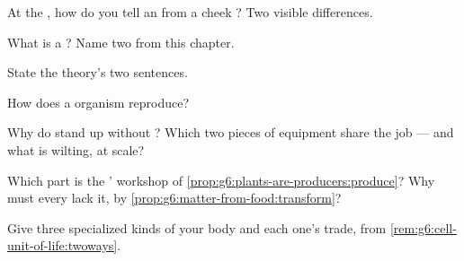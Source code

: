 \begin{exercise}[$\star$]\label{exo:g6:cell-unit-of-life:3}
At the , how do you tell an   from
a cheek ? Two visible differences.
\end{exercise}

\begin{exercise}[$\star$]\label{exo:g6:cell-unit-of-life:4}
What is a  ? Name two from this
chapter.
\end{exercise}

\begin{exercise}[$\star$]\label{exo:g6:cell-unit-of-life:5}
State the  theory's two sentences.
\end{exercise}

\begin{exercise}[$\star$]\label{exo:g6:cell-unit-of-life:6}
How does a  organism reproduce?
\end{exercise}

\begin{exercise}[$\star\star$]\label{exo:g6:cell-unit-of-life:7}
Why do  stand up without ? Which two pieces of
 equipment share the job --- and what is
wilting, at  scale?
\end{exercise}

\begin{exercise}[$\star\star$]\label{exo:g6:cell-unit-of-life:8}
Which  part is the ' workshop of
\cref{prop:g6:plants-are-producers:produce}? Why must
every   lack it, by
\cref{prop:g6:matter-from-food:transform}?
\end{exercise}

\begin{exercise}[$\star\star$]\label{exo:g6:cell-unit-of-life:9}
Give three specialized  kinds of your body and each
one's trade, from \cref{rem:g6:cell-unit-of-life:twoways}.
\end{exercise}


